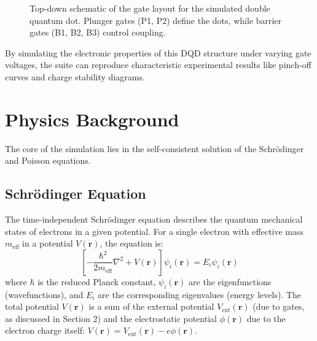\documentclass{article}
\begin{document}
\begin{figure}[h!]
    \caption{Top-down schematic of the gate layout for the simulated double quantum dot. Plunger gates (P1, P2) define the dots, while barrier gates (B1, B2, B3) control coupling.}
    \label{fig:gate_layout}
\end{figure}

By simulating the electronic properties of this DQD structure under varying gate voltages, the suite can reproduce characteristic experimental results like pinch-off curves and charge stability diagrams.

\section{Physics Background}
The core of the simulation lies in the self-consistent solution of the Schrödinger and Poisson equations.

\subsection{Schrödinger Equation}
The time-independent Schrödinger equation describes the quantum mechanical states of electrons in a given potential. For a single electron with effective mass $m_{\text{eff}}$ in a potential $V(\mathbf{r})$, the equation is:
\begin{equation}
    \left[ -\frac{\hbar^2}{2m_{\text{eff}}} \nabla^2 + V(\mathbf{r}) \right] \psi_i(\mathbf{r}) = E_i \psi_i(\mathbf{r})
\end{equation}
where $\hbar$ is the reduced Planck constant, $\psi_i(\mathbf{r})$ are the eigenfunctions (wavefunctions), and $E_i$ are the corresponding eigenvalues (energy levels). The total potential $V(\mathbf{r})$ is a sum of the external potential $V_{\text{ext}}(\mathbf{r})$ (due to gates, as discussed in Section 2) and the electrostatic potential $\phi(\mathbf{r})$ due to the electron charge itself: $V(\mathbf{r}) = V_{\text{ext}}(\mathbf{r}) - e \phi(\mathbf{r})$.
\end{document}
